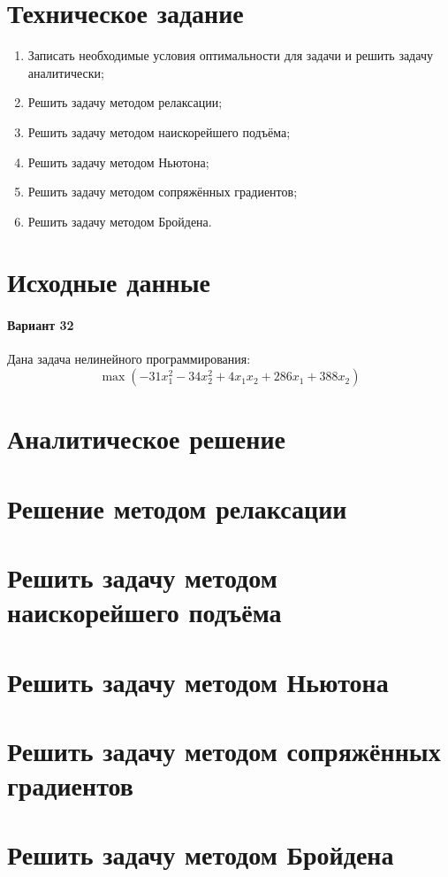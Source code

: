 





\section{Техническое задание}

\begin{enumerate}
	\setlength{\itemsep}{0em}
	\item Записать необходимые условия оптимальности для задачи и решить задачу аналитически;
	\item Решить задачу методом релаксации;
	\item Решить задачу методом наискорейшего подъёма;
	\item Решить задачу методом Ньютона;
	\item Решить задачу методом сопряжённых градиентов;
	\item Решить задачу методом Бройдена.
\end{enumerate}

\section{Исходные данные}

\paragraph{Вариант 32}

Дана задача нелинейного программирования:
\begin{equation}
	\label{eq:main}
	\max \left( -31 x_1^2 - 34 x_2^2 + 4 x_1 x_2 + 286 x_1 + 388 x_2  \right)
\end{equation}

\section{Аналитическое решение}

\section{Решение методом релаксации}

\section{Решить задачу методом наискорейшего подъёма}

\section{Решить задачу методом Ньютона}

\section{Решить задачу методом сопряжённых градиентов}

\section{Решить задачу методом Бройдена}

